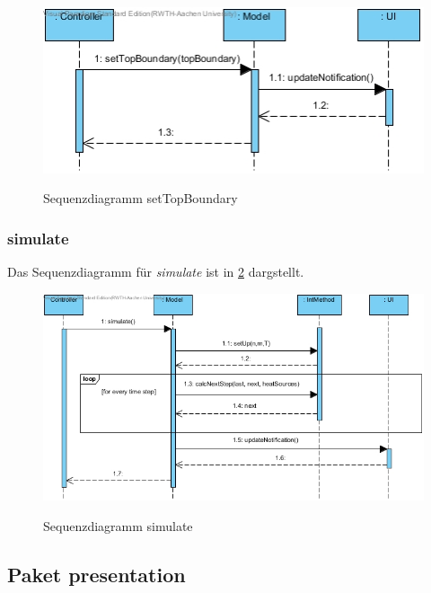 \begin{figure}[H]
	\centering
	\includegraphics[scale=.6]{Bilder/Model__setTopBoundary().jpg}\\
	\caption{Sequenzdiagramm setTopBoundary}
	\label{Sequenzdiagramm setTopBoundary}
\end{figure}

\subsubsection*{simulate}

Das Sequenzdiagramm für \emph{simulate} ist in \ref{Sequenzdiagramm simulate} dargstellt.

\begin{figure}[H]
	\centering
	\includegraphics[scale=.6]{Bilder/Model__simulate().jpg}\\
	\caption{Sequenzdiagramm simulate}
	\label{Sequenzdiagramm simulate}
\end{figure}

\subsection{Paket presentation}

